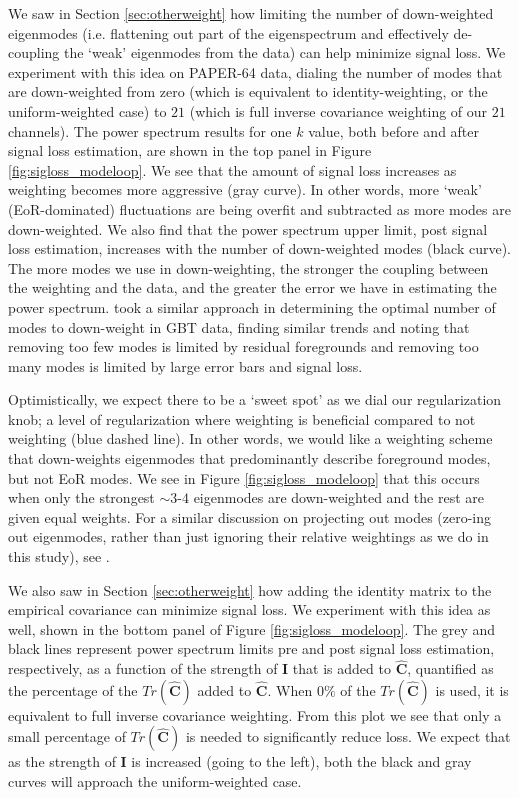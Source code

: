 \documentclass[preprint2,numberedappendix,tighten]{aastex6}  %
\begin{document}
We saw in Section \ref{sec:otherweight} how limiting the number of down-weighted eigenmodes (i.e. flattening out part of the 
eigenspectrum and effectively de-coupling the `weak' eigenmodes from the data) can help minimize signal loss. We experiment with this idea on PAPER-64 data, dialing the number of modes 
that are down-weighted from zero (which is equivalent to identity-weighting, or the uniform-weighted case) to $21$ (which is full inverse 
covariance weighting of our $21$ channels). The power spectrum results for one $k$ value, both before and after signal loss 
estimation, are shown in the top panel in Figure \ref{fig:sigloss_modeloop}. We see that the amount of signal loss increases as weighting 
becomes more aggressive (gray curve). In other words, more `weak' (EoR-dominated) fluctuations are being overfit and 
subtracted as more modes are down-weighted. We also find that the power spectrum upper limit, post signal loss estimation, 
increases with the number of down-weighted modes (black curve). The more modes we use in down-weighting, the stronger the coupling between the weighting and the data, and the greater the error we have in estimating the power spectrum. \citet{switzer_et_al2013} took a similar approach in determining the optimal number of modes to down-weight in GBT data, finding similar trends and noting that removing too few modes is limited by residual foregrounds and removing too many modes is limited by large error bars and signal loss.

Optimistically, we expect there to be a `sweet spot' as we dial our regularization knob; a level of regularization where weighting 
is beneficial compared to not weighting (blue dashed line). In other words, we would like a weighting scheme that down-weights eigenmodes that predominantly describe foreground modes, but not EoR modes. We see in Figure \ref{fig:sigloss_modeloop} that this occurs when 
only the strongest $\sim3$-$4$ eigenmodes are down-weighted and the rest are given equal weights. For a similar discussion on projecting out modes (zero-ing out eigenmodes, rather than just ignoring their relative weightings as we do in this study), see \citet{switzer_et_al2013}. 

We also saw in Section \ref{sec:otherweight} how adding the identity matrix to the empirical covariance can minimize signal loss. We experiment with this idea as well, shown in the bottom panel of Figure \ref{fig:sigloss_modeloop}. The grey and black lines represent power spectrum limits pre and post signal loss estimation, respectively, as a function of the strength of $\textbf{I}$ that is added to $\widehat{\textbf{C}}$, quantified as the percentage of the $Tr(\widehat{\textbf{C}})$ added to $\widehat{\textbf{C}}$. When $0\%$  of the $Tr(\widehat{\textbf{C}})$ is used, it is equivalent to full inverse covariance weighting. From this plot we see that only a small percentage of $Tr(\widehat{\textbf{C}})$ is needed to significantly reduce loss. We expect that as the strength of $\textbf{I}$ is increased (going to the left), both the black and gray curves will approach the uniform-weighted case.
\end{document}
